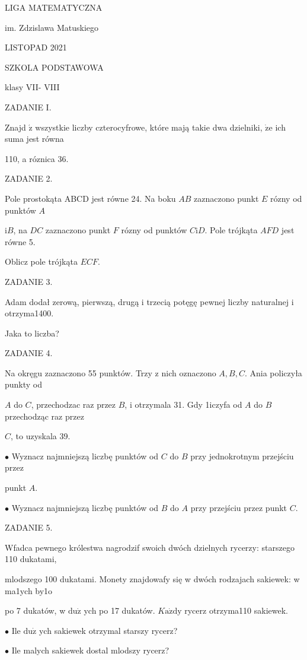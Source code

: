 \documentclass[a4paper,12pt]{article}
\begin{document}
LIGA MATEMATYCZNA

im. Zdzislawa Matuskiego

LISTOPAD 2021

SZKOLA PODSTAWOWA

klasy VII- VIII

ZADANIE I.

Znajd $\acute{\mathrm{z}}$ wszystkie liczby czterocyfrowe, które mają takie dwa dzielniki, $\dot{\mathrm{z}}\mathrm{e}$ ich suma jest równa

110, a róznica 36.

ZADANIE 2.

Pole prostokąta ABCD jest równe 24. Na boku $AB$ zaznaczono punkt $E$ rózny od punktów $A$

$\mathrm{i}B$, na $DC$ zaznaczono punkt $F$ rózny od punktów $C\mathrm{i}D$. Pole trójkąta $AFD$ jest równe 5.

Oblicz pole trójkąta $ECF.$

ZADANIE 3.

Adam dodał zerową, pierwszą, drugą i trzecią potęgę pewnej liczby naturalnej i otrzyma1400.

Jaka to liczba?

ZADANIE 4.

Na okręgu zaznaczono 55 punktów. Trzy z nich oznaczono $A, B, C$. Ania policzyła punkty od

$A$ do $C$, przechodzac raz przez $B$, i otrzymala 31. Gdy 1iczyfa od $A$ do $B$ przechodząc raz przez

$C$, to uzyskala 39.

$\bullet$ Wyznacz najmniejszą liczbę punktów od $C$ do $B$ przy jednokrotnym przejściu przez

punkt $A.$

$\bullet$ Wyznacz najmniejszą liczbę punktów od $B$ do $A$ przy przejściu przez punkt $C.$

ZADANIE 5.

Wfadca pewnego królestwa nagrodzif swoich dwóch dzielnych rycerzy: starszego 110 dukatami,

mlodszego 100 dukatami. Monety znajdowafy się w dwóch rodzajach sakiewek: w ma1ych by1o

po 7 dukatów, w $\mathrm{d}\mathrm{u}\dot{\mathrm{z}}$ ych po 17 dukatów. $K\mathrm{a}\dot{\mathrm{z}}\mathrm{d}\mathrm{y}$ rycerz otrzyma110 sakiewek.

$\bullet$ Ile $\mathrm{d}\mathrm{u}\dot{\mathrm{z}}$ ych sakiewek otrzymal starszy rycerz?

$\bullet$ Ile malych sakiewek dostal mlodszy rycerz?
\end{document}
